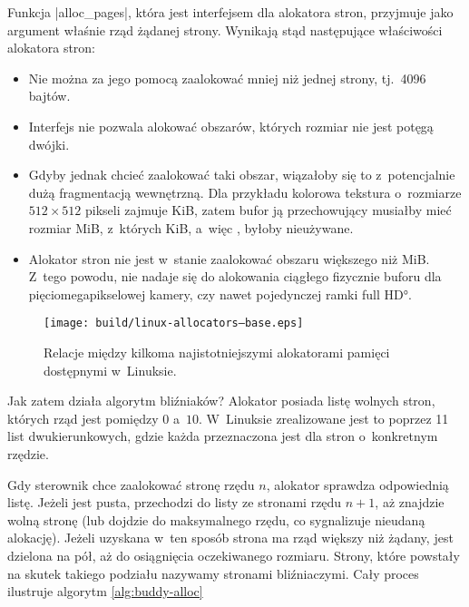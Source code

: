 Funkcja \code|alloc_pages|, która jest interfejsem dla alokatora
stron, przyjmuje jako argument właśnie rząd żądanej strony.  Wynikają
stąd następujące właściwości alokatora stron:

\begin{itemize}
\item Nie można za jego pomocą zaalokować mniej niż jednej strony,
  tj.\ 4096 bajtów.
\item Interfejs nie pozwala alokować obszarów, których rozmiar nie
  jest potęgą dwójki.
\item Gdyby jednak chcieć zaalokować taki obszar, wiązałoby się to
  z~potencjalnie dużą fragmentacją wewnętrzną.  Dla przykładu kolorowa
  tekstura o~rozmiarze $512 \times 512$ pikseli zajmuje
  \unit[768]{KiB}, zatem bufor ją przechowujący musiałby mieć rozmiar
  \unit[1]{MiB}, z~których \unit[256]{KiB}, a~więc ,
  byłoby nieużywane.
\item Alokator stron nie jest w~stanie zaalokować obszaru większego
  niż \unit[4]{MiB}.  Z~tego powodu, nie nadaje się do alokowania
  ciągłego fizycznie buforu dla pięciomegapikselowej kamery, czy nawet
  pojedynczej ramki \ang*{full HD}.
\end{itemize}

\begin{figure}[tbp]
  \centering
  \texttt{[image: build/linux-allocators--base.eps]}
  \caption[Alokatory dostępne w~jądrze Linux.]{Relacje między kilkoma
    najistotniejszymi alokatorami pamięci dostępnymi w~Linuksie.}
  \label{fig:allocators-base}
\end{figure}

Jak zatem działa algorytm bliźniaków?  Alokator posiada listę wolnych
stron, których rząd jest pomiędzy $0$ a~$10$.  W~Linuksie zrealizowane
jest to poprzez 11 list dwukierunkowych, gdzie każda przeznaczona jest
dla stron o~konkretnym rzędzie.

Gdy sterownik chce zaalokować stronę rzędu $n$, alokator sprawdza
odpowiednią listę.  Jeżeli jest pusta, przechodzi do listy ze stronami
rzędu $n+1$, aż znajdzie wolną stronę (lub dojdzie do maksymalnego
rzędu, co sygnalizuje nieudaną alokację).  Jeżeli uzyskana w~ten
sposób strona ma rząd większy niż żądany, jest dzielona na pół, aż do
osiągnięcia oczekiwanego rozmiaru.  Strony, które powstały na skutek
takiego podziału nazywamy stronami bliźniaczymi.  Cały proces
ilustruje algorytm \ref{alg:buddy-alloc}

